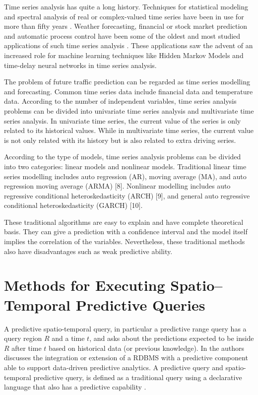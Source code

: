 Time series analysis has quite a long history. Techniques for statistical modeling and spectral analysis of real or complex-valued time series have been in use for more than fifty years \cite{Hyndman2006, Chatfield2019}. Weather forecasting, financial or stock market prediction and automatic process control have been some of the oldest and most studied applications of such time series analysis \cite{Box1976}. These applications saw the advent of an increased role for machine learning techniques like Hidden Markov Models and time-delay neural networks in time series analysis.

The problem of future traffic prediction can be regarded as time series modelling and forecasting. Common time series data include financial data and temperature data. According to the number of independent variables, time series analysis problems can be divided into univariate time series analysis and multivariate time series analysis. In univariate time series, the current value of the series is only related to its historical values. While in multivariate time series, the current value is not only related with its history but is also related to extra driving series. 

According to the type of models, time series analysis problems can be divided into two categories: linear models and nonlinear models. Traditional linear time series modelling includes auto regression (AR), moving average (MA), and auto regression moving average (ARMA) [8]. Nonlinear modelling includes auto regressive conditional heteroskedasticity (ARCH) [9], and general auto regressive conditional heteroskedasticity (GARCH) [10].

These traditional algorithms are easy to explain and have complete theoretical basis. They can give a prediction with a confidence interval and the model itself implies the correlation of the variables. Nevertheless, these traditional methods also have disadvantages such as weak predictive ability.

\section{Methods for Executing Spatio--Temporal Predictive Queries}
\label{Sec:RelatedWorksQueries}

A predictive spatio-temporal query, in particular a predictive range query has a query region $R$ and a time $t$, and asks about the predictions expected to be inside $R$ after time $t$ based on historical data (or previous knowledge).  In \cite{Akdere2011} the authors discusses the integration or extension of a RDBMS with a predictive component able to support data-driven predictive analytics. A predictive query and spatio-temporal predictive query, is defined as a traditional query using a declarative language that also has a predictive capability \cite{Hendawi2012}. 

